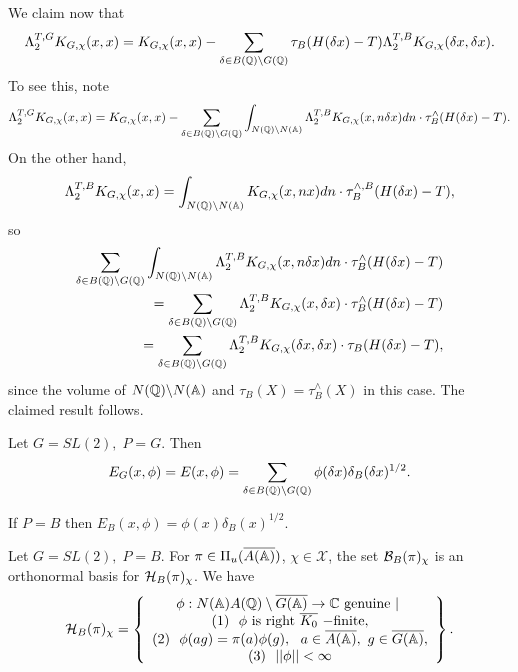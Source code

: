 \begin{example}
We claim now that 
\begin{equation}
\Lambda _2^{T,G}K_{G,\chi }(x,x)=K_{G,\chi }(x,x)-\sum_{\delta \in B(\qqq %
)\backslash G(\qqq )}\tau _B(H(\delta x)-T)\Lambda _2^{T,B}K_{G,\chi
}(\delta x,\delta x).
\end{equation}
To see this, note 
\[
\Lambda _2^{T,G}K_{G,\chi }(x,x)=K_{G,\chi }(x,x)-\sum_{\delta \in B(\qqq %
)\backslash G(\qqq )}\int_{N(\qqq )\backslash N(\aaa )}\Lambda
_2^{T,B}K_{G,\chi }(x,n\delta x)dn\cdot \tau _B^{\wedge }(H(\delta x)-T).
\]
On the other hand, 
\[
\Lambda _2^{T,B}K_{G,\chi }(x,x)=\int_{N(\qqq )\backslash N(\aaa %
)}K_{G,\chi }(x,nx)dn\cdot \tau _B^{\wedge ,B}(H(\delta x)-T),
\]
so 
\begin{eqnarray}
\sum_{\delta \in B(\mathbb{Q} )\backslash G(\mathbb{Q} )}\int_{N(\mathbb{Q} )\backslash
N(\mathbb{A} )}\Lambda _2^{T,B}K_{G,\chi }(x,n\delta x)dn\cdot \tau _B^{\wedge
}(H(\delta x)-T)  \nonumber \\
=\sum_{\delta \in B(\mathbb{Q} )\backslash G(\mathbb{Q} )}\Lambda _2^{T,B}K_{G,\chi
}(x,\delta x)\cdot \tau _B^{\wedge }(H(\delta x)-T)  \nonumber \\
=\sum_{\delta \in B(\mathbb{Q} )\backslash G(\mathbb{Q} )}\Lambda _2^{T,B}K_{G,\chi
}(\delta x,\delta x)\cdot \tau _B(H(\delta x)-T),
\end{eqnarray}
since the volume of $N(\mathbb{Q} )\backslash N(\mathbb{A} )$ and $\tau _B(X)=\tau
_B^{\wedge }(X)$ in this case. The claimed result follows.
\end{example}

\begin{example}
Let $G=SL(2),\;P=G$. Then 
\[
E_G(x,\phi )=E(x,\phi )=\sum_{\delta \in B(\qqq )\backslash G(\qqq %
)}\phi (\delta x)\delta _B(\delta x)^{1/2}.
\]

If $P=B$ then $E_B(x,\phi )=\phi (x)\delta _B(x)^{1/2}$.
\end{example}

\begin{example}
Let $G=SL(2),\;P=B$. For $\pi \in \Pi _u(\overline{A(\mathbb{A} )})$,
$\chi \in \mathcal{X}$,
the set ${\cal{B}}_B(\pi )_\chi $ is an orthonormal basis for
${\cal{H}}_B(\pi )_\chi $. We have 
\[
{\cal{H}}_B(\pi )_\chi =\left\{
\begin{array}{c}
\phi:N(\mathbb{A} )A(\mathbb{Q} )\setminus \overline{G(\mathbb{A} )}\rightarrow
{\mathbb C}\ {\rm genuine\ }|\ \\
(1)\ \  \phi {\rm\ is\  right}\  \overline{K_0}\ {\rm -finite},\\
(2) \ \ \phi(ag)=\pi(a)\phi(g),
\ \ a\in \overline{A(\mathbb{A} )},\ g\in \overline{G(\mathbb{A} )},\\
(3)\ \  ||\phi ||<\infty
\end{array}
\right\}.
\]
\end{example}

